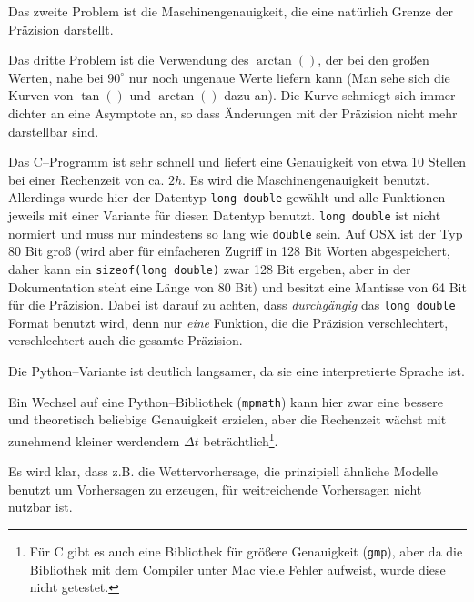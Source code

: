 \documentclass[paper=a4,notitlepage,parskip=half,plainheadsepline]{scrartcl}
\begin{document}
Das zweite Problem ist die Maschinengenauigkeit, die eine natürlich Grenze der Präzision darstellt.

Das dritte Problem ist die Verwendung des $\arctan()$, der bei den großen Werten, nahe bei
 $90^\circ$ nur noch ungenaue Werte liefern kann (Man sehe sich die Kurven von $\tan()$ und $\arctan()$ dazu an). Die Kurve schmiegt sich immer dichter an eine Asymptote an, so dass Änderungen mit der Präzision nicht mehr darstellbar sind. 

Das C--Programm ist sehr schnell und liefert eine Genauigkeit von etwa 10 Stellen bei einer Rechenzeit von ca. $2h$.
Es wird die Maschinengenauigkeit benutzt. Allerdings wurde hier der Datentyp \texttt{long double} gewählt und alle Funktionen jeweils mit einer Variante für diesen Datentyp benutzt.
 \texttt{long double} ist nicht normiert und muss nur mindestens so lang wie \texttt{double} sein.
 Auf OSX ist der Typ 80 Bit groß (wird aber für einfacheren Zugriff in 128 Bit Worten abgespeichert, daher kann ein \texttt{sizeof(long double)} zwar 128 Bit ergeben, aber in der  Dokumentation steht eine Länge von 80 Bit) und besitzt eine Mantisse von 64 Bit für die Präzision. Dabei ist darauf zu achten, dass \emph{durchgängig} das \texttt{long double} Format benutzt wird, denn nur \emph{eine} Funktion, die die Präzision verschlechtert, verschlechtert auch die gesamte Präzision. 

Die Python--Variante ist deutlich langsamer, da sie eine interpretierte Sprache ist.

Ein Wechsel auf eine Python--Bibliothek (\texttt{mpmath}) kann hier zwar eine bessere und theoretisch beliebige Genauigkeit erzielen, aber die Rechenzeit wächst mit zunehmend kleiner werdendem $\Delta t$ beträchtlich\footnote{Für C gibt es auch eine Bibliothek für größere Genauigkeit (\texttt{gmp}), aber da die Bibliothek mit dem Compiler unter Mac viele Fehler aufweist, wurde diese nicht getestet.}.

Es wird klar, dass z.B. die Wettervorhersage, die prinzipiell ähnliche Modelle benutzt um
Vorhersagen zu erzeugen, für weitreichende Vorhersagen nicht nutzbar ist.
\newpage
\end{document}
